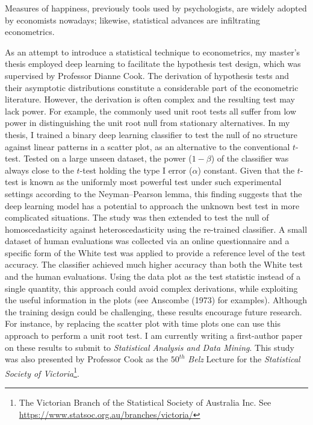\documentclass[12pt,]{article}
\let\rmarkdownfootnote\footnote%
\def\footnote{\protect\rmarkdownfootnote}
\begin{document}
Measures of happiness, previously tools used by psychologists, are
widely adopted by economists nowadays; likewise, statistical advances
are infiltrating econometrics.

As an attempt to introduce a statistical technique to econometrics, my
master's thesis employed deep learning to facilitate the hypothesis test
design, which was supervised by Professor Dianne Cook. The derivation of
hypothesis tests and their asymptotic distributions constitute a
considerable part of the econometric literature. However, the derivation
is often complex and the resulting test may lack power. For example, the
commonly used unit root tests all suffer from low power in
distinguishing the unit root null from stationary alternatives. In my
thesis, I trained a binary deep learning classifier to test the null of
no structure against linear patterns in a scatter plot, as an
alternative to the conventional \(t\)-test. Tested on a large unseen
dataset, the power (\(1-\beta\)) of the classifier was always close to
the \(t\)-test holding the type I error (\(\alpha\)) constant. Given
that the \(t\)-test is known as the uniformly most powerful test under
such experimental settings according to the Neyman--Pearson lemma, this
finding suggests that the deep learning model has a potential to
approach the unknown best test in more complicated situations. The study
was then extended to test the null of homoscedasticity against
heteroscedasticity using the re-trained classifier. A small dataset of
human evaluations was collected via an online questionnaire and a
specific form of the White test was applied to provide a reference level
of the test accuracy. The classifier achieved much higher accuracy than
both the White test and the human evaluations. Using the data plot as
the test statistic instead of a single quantity, this approach could
avoid complex derivations, while exploiting the useful information in
the plots (see Anscombe (1973) for examples). Although the training
design could be challenging, these results encourage future research.
For instance, by replacing the scatter plot with time plots one can use
this approach to perform a unit root test. I am currently writing a
first-author paper on these results to submit to \emph{Statistical
Analysis and Data Mining}. This study was also presented by Professor
Cook as the \(50^{th}\) \emph{Belz} Lecture for the \emph{Statistical
Society of Victoria}\footnote{The Victorian Branch of the Statistical
  Society of Australia Inc. See
  \url{https://www.statsoc.org.au/branches/victoria/}}.
\end{document}
